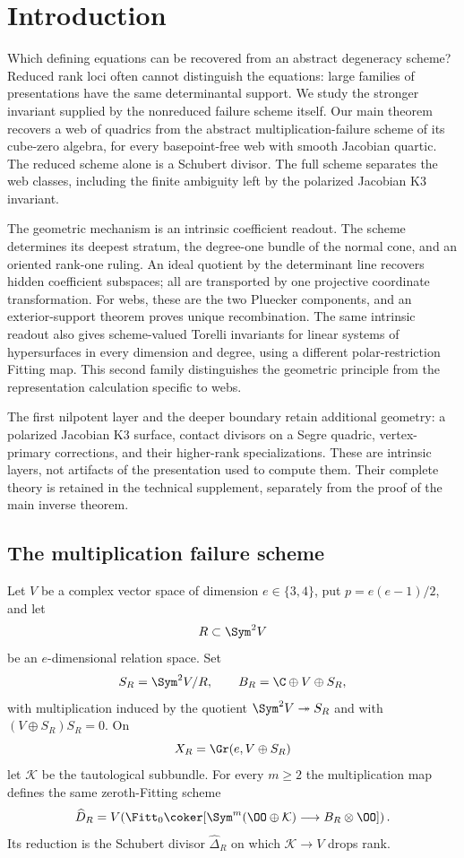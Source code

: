 \section{Introduction}
\label{sec:introduction-v132}

Which defining equations can be recovered from an abstract degeneracy
scheme?  Reduced rank loci often cannot distinguish the equations:
large families of presentations have the same determinantal support.
We study the stronger invariant supplied by the nonreduced failure
scheme itself.  Our main theorem recovers a web of quadrics from the
abstract multiplication-failure scheme of its cube-zero algebra, for
every basepoint-free web with smooth Jacobian quartic.  The reduced
scheme alone is a Schubert divisor.  The full scheme separates the
web classes, including the finite ambiguity left by the polarized
Jacobian K3 invariant.

The geometric mechanism is an intrinsic coefficient readout.  The
scheme determines its deepest stratum, the degree-one bundle of the
normal cone, and an oriented rank-one ruling.  An ideal quotient by
the determinant line recovers hidden coefficient subspaces; all are
transported by one projective coordinate transformation.  For webs,
these are the two Pluecker components, and an exterior-support theorem
proves unique recombination.  The same intrinsic readout also gives
scheme-valued Torelli invariants for linear systems of hypersurfaces
in every dimension and degree, using a different polar-restriction
Fitting map.  This second family distinguishes the geometric principle
from the representation calculation specific to webs.

The first nilpotent layer and the deeper boundary retain additional
geometry: a polarized Jacobian K3 surface, contact divisors on a Segre
quadric, vertex-primary corrections, and their higher-rank
specializations.  These are intrinsic layers, not artifacts of the
presentation used to compute them.  Their complete theory is retained
in the technical supplement, separately from the proof of the main
inverse theorem.

\subsection{The multiplication failure scheme}

Let \(V\) be a complex vector space of dimension
\(e\in\{3,4\}\), put \(p=e(e-1)/2\), and let
\[
 R\subset\Sym^2V
\]
be an \(e\)-dimensional relation space.  Set
\[
 S_R=\Sym^2V/R,\qquad
 B_R=\C\oplus V\oplus S_R,
\]
with multiplication induced by the quotient
\(\Sym^2V\twoheadrightarrow S_R\) and with
\((V\oplus S_R)S_R=0\).  On
\[
 X_R=\Gr(e,V\oplus S_R)
\]
let \(\mathcal K\) be the tautological subbundle.  For every
\(m\ge2\) the multiplication map defines the same zeroth-Fitting
scheme
\begin{equation}\label{eq:failure-intro}
 \widehat D_R=
 V\!\left(
 \Fitt_0\coker[
 \Sym^m(\OO\oplus\mathcal K)\longrightarrow
 B_R\otimes\OO]\right).
\end{equation}
Its reduction is the Schubert divisor
\(\widehat\Delta_R\) on which \(\mathcal K\to V\) drops rank.

